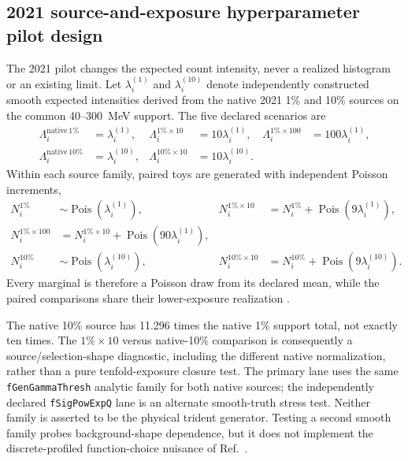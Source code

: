 \subsection{2021 source-and-exposure hyperparameter pilot design}
\label{sec:planned-2021-exposure-ls-toys}

The 2021 pilot changes the expected count intensity, never a realized histogram or an
existing limit. Let $\lambda_i^{(1)}$ and $\lambda_i^{(10)}$ denote independently
constructed smooth expected intensities derived from the native 2021 1\% and 10\%
sources on the common 40--300~MeV support. The five declared scenarios are
\begin{align}
\Lambda_i^{\mathrm{native}\,1\%} &= \lambda_i^{(1)}, &
\Lambda_i^{1\%\times10} &= 10\lambda_i^{(1)}, &
\Lambda_i^{1\%\times100} &= 100\lambda_i^{(1)}, \nonumber\\
\Lambda_i^{\mathrm{native}\,10\%} &= \lambda_i^{(10)}, &
\Lambda_i^{10\%\times10} &= 10\lambda_i^{(10)}.
\label{eq:v4p1-ls-pilot-scenarios}
\end{align}
Within each source family, paired toys are generated with independent Poisson
increments,
\begin{align}
N_i^{1\%} &\sim \operatorname{Pois}\!\left(\lambda_i^{(1)}\right), &
N_i^{1\%\times10} &= N_i^{1\%}
 + \operatorname{Pois}\!\left(9\lambda_i^{(1)}\right), \nonumber\\
N_i^{1\%\times100} &= N_i^{1\%\times10}
 + \operatorname{Pois}\!\left(90\lambda_i^{(1)}\right), \nonumber\\
N_i^{10\%} &\sim \operatorname{Pois}\!\left(\lambda_i^{(10)}\right), &
N_i^{10\%\times10} &= N_i^{10\%}
 + \operatorname{Pois}\!\left(9\lambda_i^{(10)}\right).
\label{eq:v4p1-ls-pilot-increments}
\end{align}
Every marginal is therefore a Poisson draw from its declared mean, while the paired
comparisons share their lower-exposure realization
\cite{Kingman1993PoissonProcesses,HistFactory}.

The native 10\% source has 11.296 times the native 1\% support total, not exactly ten
times. The $1\%\times10$ versus native-10\% comparison is consequently a
source/selection-shape diagnostic, including the different native normalization, rather
than a pure tenfold-exposure closure test. The primary lane uses the same
\texttt{fGenGammaThresh} analytic family for both native sources; the independently
declared \texttt{fSigPowExpQ} lane is an alternate smooth-truth stress test. Neither
family is asserted to be the physical trident generator. Testing a second smooth
family probes background-shape dependence, but it does not implement the
discrete-profiled function-choice nuisance of Ref.~\cite{Dauncey2015DiscreteProfiling}.

